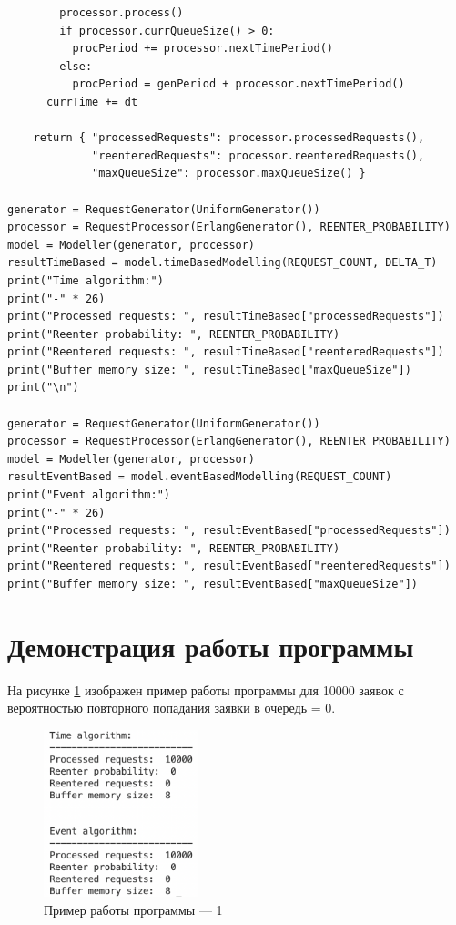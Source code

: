 \documentclass[12pt]{report}
\begin{document}
\begin{lstlisting}
        processor.process()
        if processor.currQueueSize() > 0:
          procPeriod += processor.nextTimePeriod()
        else:
          procPeriod = genPeriod + processor.nextTimePeriod()
      currTime += dt

    return { "processedRequests": processor.processedRequests(),
             "reenteredRequests": processor.reenteredRequests(),
             "maxQueueSize": processor.maxQueueSize() }

generator = RequestGenerator(UniformGenerator())
processor = RequestProcessor(ErlangGenerator(), REENTER_PROBABILITY)
model = Modeller(generator, processor)
resultTimeBased = model.timeBasedModelling(REQUEST_COUNT, DELTA_T)
print("Time algorithm:")
print("-" * 26)
print("Processed requests: ", resultTimeBased["processedRequests"])
print("Reenter probability: ", REENTER_PROBABILITY)
print("Reentered requests: ", resultTimeBased["reenteredRequests"])
print("Buffer memory size: ", resultTimeBased["maxQueueSize"])
print("\n")

generator = RequestGenerator(UniformGenerator())
processor = RequestProcessor(ErlangGenerator(), REENTER_PROBABILITY)
model = Modeller(generator, processor)
resultEventBased = model.eventBasedModelling(REQUEST_COUNT)
print("Event algorithm:")
print("-" * 26)
print("Processed requests: ", resultEventBased["processedRequests"])
print("Reenter probability: ", REENTER_PROBABILITY)
print("Reentered requests: ", resultEventBased["reenteredRequests"])
print("Buffer memory size: ", resultEventBased["maxQueueSize"])
\end{lstlisting}


\clearpage
\section*{Демонстрация работы программы}
На рисунке \ref{fig:pic1} изображен пример работы программы для 10000 заявок с вероятностью повторного попадания заявки в очередь = 0.

\begin{figure}[h!btp]
	\centering
	\includegraphics[width=0.4\textwidth]{inc/pic1.png}
	\caption{Пример работы программы --- 1}
	\label{fig:pic1}	
\end{figure}
\end{document}
